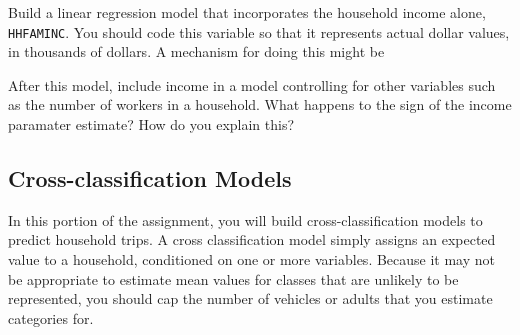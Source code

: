Build a linear regression model that incorporates the household income
alone, \verb#HHFAMINC#. You should code this variable so that it represents
actual dollar values, in thousands of dollars. A mechanism for doing this might
be 
\begin{knitrout}
\color{fgcolor}\begin{kframe}
\begin{alltt}
 \hlkwb{<-} \hlstd{(}\hlopt{-}\hlstd{,} \hlopt{-}\hlstd{,} \hlopt{-}\hlstd{)}
\hlopt{$} \hlkwb{<-} \hlopt{$}
\hlopt{$} \hlkwb{<-} \hlopt{$} \hlopt{==} \hlstd{,} \hlstd{,} \hlopt{$} \hlopt{==}
    \hlstd{,} \hlopt{$} \hlopt{*}  \hlopt{-} \hlstd{)))}
\end{alltt}
\end{kframe}
\end{knitrout}


After this model, include income in a model controlling for other variables such
as the number of workers in a household. What happens to the sign of the income
paramater estimate? How do you explain this?



\subsection{Cross-classification Models}\label{sec:crossclass}
In this portion of the assignment, you will build cross-classification models to
predict household trips. A cross classification model simply
assigns an expected value to a household, conditioned on one or more variables. 
Because it may not be appropriate to estimate mean values for classes that are 
unlikely to be represented, you should cap the number of vehicles or adults 
that you estimate categories for.
\begin{knitrout}
\color{fgcolor}\begin{kframe}
\begin{alltt}
\hlopt{$} \hlkwb{<-} \hlopt{$} \hlopt{>} \hlstd{,} \hlopt{$}
\hlopt{$} \hlkwb{<-} \hlopt{$} \hlopt{>} \hlstd{,} \hlopt{$}
\end{alltt}
\end{kframe}
\end{knitrout}



